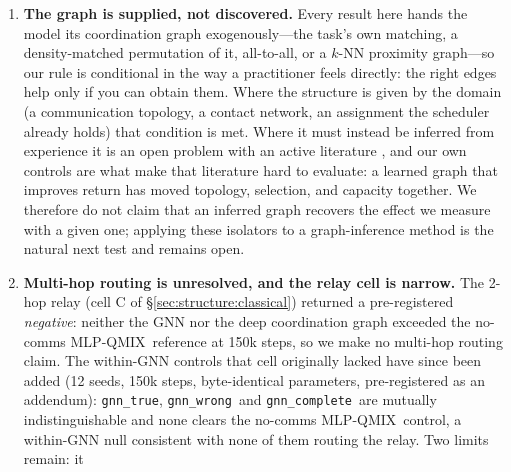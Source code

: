 \documentclass[10pt]{article}
\newcommand{\algoname}[1]{\textsc{#1}}
\newcommand{\mlpqmix}{\algoname{MLP-QMIX}}
\newcommand{\gtrue}{\texttt{gnn\_true}}
\newcommand{\gwrong}{\texttt{gnn\_wrong}}
\newcommand{\gcomplete}{\texttt{gnn\_complete}}
\begin{document}
\begin{enumerate}[leftmargin=*,itemsep=0pt,topsep=2pt]
        whether the benefit degrades gracefully or cliffs as the graph drifts
        from correct. The graded sweep this needs is pre-registered but not
        run (\texttt{results/phaseE\_misspec/PREREGISTRATION.md}, committed
        before submission). Note that the density-matched constraint bounds
        which levels exist at all: a 1-regular graph cannot agree with the
        task matching on exactly $m{-}1$ of its $m$ edges, so at $N{=}10$ the
        achievable grid is $p\in\{0,0.2,0.4,0.6,1\}$ rather than an evenly
        spaced one. Turning the binary right-vs-wrong contrast into a graded
        mis-specification-cost curve remains the cheapest decision-relevant
        extension.
  \item \textbf{The graph is supplied, not discovered.} Every result here hands
        the model its coordination graph exogenously---the task's own matching,
        a density-matched permutation of it, all-to-all, or a $k$-NN proximity
        graph---so our rule is conditional in the way a practitioner feels
        directly: the right edges help only if you can obtain them. Where the
        structure is given by the domain (a communication topology, a contact
        network, an assignment the scheduler already holds) that condition is
        met. Where it must instead be inferred from experience it is an open
        problem with an active literature
        \citep{duan_2024_ltscg,duan_2024_gacg,gupta_2026_dmcg}, and our own
        controls are what make that literature hard to evaluate: a learned
        graph that improves return has moved topology, selection, and capacity
        together. We therefore do not claim that an inferred graph recovers the
        effect we measure with a given one; applying these isolators to a
        graph-inference method is the natural next test and remains open.
  \item \textbf{Multi-hop routing is unresolved, and the relay cell is
        narrow.} The 2-hop relay (cell C of \S\ref{sec:structure:classical})
        returned a pre-registered \emph{negative}: neither the GNN nor the deep
        coordination graph exceeded the no-comms \mlpqmix\ reference at 150k
        steps, so we make no multi-hop routing claim. The within-GNN controls
        that cell originally lacked have since been added (12 seeds, 150k
        steps, byte-identical parameters, pre-registered as an addendum):
        \gtrue, \gwrong\ and \gcomplete\ are mutually indistinguishable and
        none clears the no-comms \mlpqmix\ control, a within-GNN null
        consistent with none of them routing the relay. Two limits remain: it

\end{enumerate}
\end{document}
